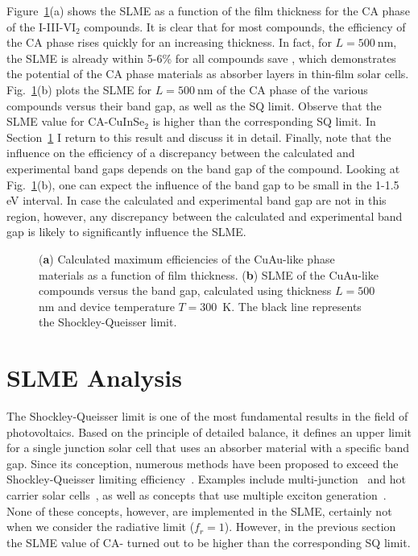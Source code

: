 \begin{refsection}
Figure~\ref{slme:fig-SLME_CuAu}(a) shows the SLME as a function of the film thickness for the CA phase of the I-III-VI$_2$ compounds. It is clear that for most 
compounds, the efficiency of the CA phase rises quickly for an increasing 
thickness. In fact, for $L=500~\si{\nano\meter}$, the SLME is already within 5-6\% for all compounds save , which demonstrates the potential of the CA phase materials as 
absorber layers in thin-film solar cells. Fig.~\ref{slme:fig-SLME_CuAu}(b) plots the SLME for $L=500~\si{\nano\meter}$ of the CA phase of the various 
compounds versus their band gap, as well as the SQ limit. Observe 
that the SLME value for \mbox{CA-CuInSe$_2$} is higher than the 
corresponding SQ limit. In Section~\ref{slme:sec-analysis} I return to this 
result and discuss it in detail. Finally, note that the influence on the efficiency of a 
discrepancy between the calculated and experimental band gaps depends on the band 
gap of the compound.
Looking at Fig.~\ref{slme:fig-SLME_CuAu}(b), one can expect the 
influence of the band gap to be small in the 1-1.5 \si{\electronvolt} 
interval. In case the calculated and experimental band gap are not in this 
region, however, any discrepancy between the calculated and experimental band 
gap is likely to significantly influence the SLME. 

\begin{figure}[ht] 
\centering 
\captionsetup{width=0.9\textwidth}

\caption{(\textbf{a}) Calculated maximum efficiencies of the CuAu-like phase materials as a function of film thickness. (\textbf{b}) SLME of the CuAu-like compounds versus the band gap, calculated using thickness $L = 500$ \si{\nano\meter} and 
device temperature $T = 300$~\si{\kelvin}. The black line represents the 
Shockley-Queisser limit.} 
\label{slme:fig-SLME_CuAu} 
\end{figure} 
 
\section{SLME Analysis} \label{slme:sec-analysis} 
 
The Shockley-Queisser limit is one of the most fundamental results in the 
field of photovoltaics. Based on the principle of detailed balance, it defines 
an upper limit for a single junction solar cell that uses an absorber material 
with a specific band gap. Since its conception, numerous methods have been 
proposed to exceed the Shockley-Queisser limiting 
efficiency~\cite{Nelson2013}. Examples include multi-junction~\cite{Shah2004, 
Heremans2009} and hot carrier solar cells~\cite{Konig2010}, as well as 
concepts that use multiple exciton generation~\cite{Hanna2006}. None of these 
concepts, however, are implemented in the SLME, certainly not when we consider 
the radiative limit ($f_r = 1$). However, in the previous section the SLME 
value of CA- turned out to be higher than the corresponding SQ limit. 


\end{refsection}
